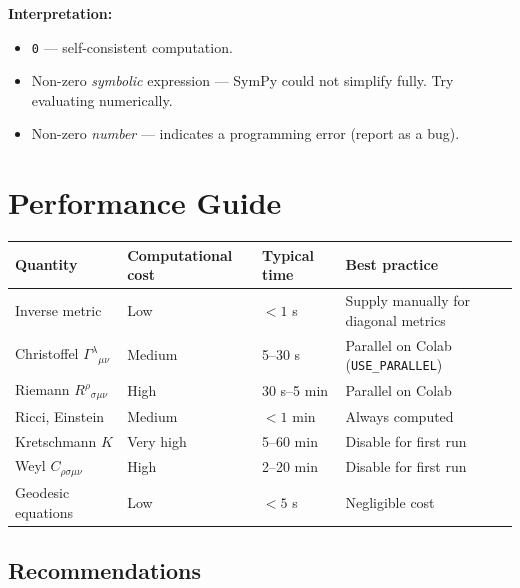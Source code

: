\documentclass[11pt,a4paper]{article}
\newcommand{\code}[1]{\texttt{\small#1}}
\renewcommand{\Gamma}{\varGamma}
\begin{document}
\textbf{Interpretation:}
\begin{itemize}
  \item \code{0} — self-consistent computation.
  \item Non-zero \emph{symbolic} expression — SymPy could not simplify
        fully.  Try evaluating numerically.
  \item Non-zero \emph{number} — indicates a programming error (report
        as a bug).
\end{itemize}

\section{Performance Guide}
\label{sec:perf}

\begin{center}
\begin{longtable}{llll}
  \toprule
  Quantity & Computational cost & Typical time & Best practice \\
  \midrule\endhead
  Inverse metric & Low & $< 1$ s
    & Supply manually for diagonal metrics \\
  Christoffel $\Gamma^\lambda{}_{\mu\nu}$ & Medium & 5--30 s
    & Parallel on Colab (\code{USE\_PARALLEL}) \\
  Riemann $R^\rho{}_{\sigma\mu\nu}$ & High & 30 s--5 min
    & Parallel on Colab \\
  Ricci, Einstein & Medium & $< 1$ min
    & Always computed \\
  Kretschmann $K$ & Very high & 5--60 min
    & Disable for first run \\
  Weyl $C_{\rho\sigma\mu\nu}$ & High & 2--20 min
    & Disable for first run \\
  Geodesic equations & Low & $< 5$ s
    & Negligible cost \\
  \bottomrule
\end{longtable}
\end{center}

\subsection*{Recommendations}
\end{document}

